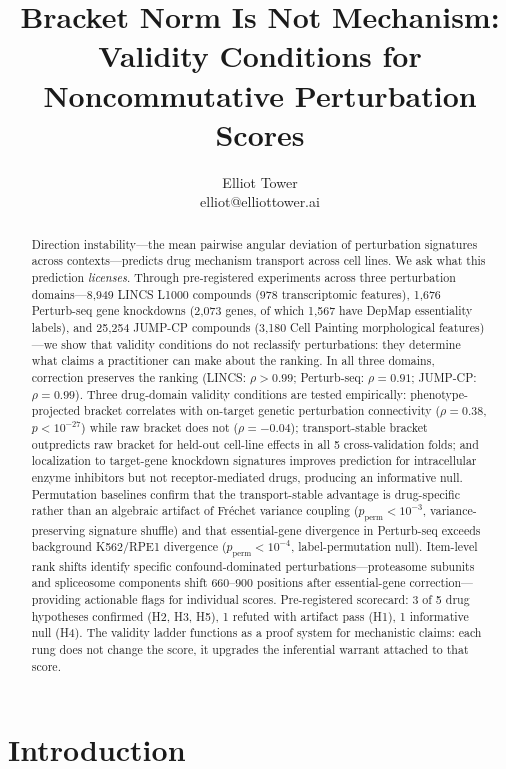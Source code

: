 \documentclass{article}
\title{Bracket Norm Is Not Mechanism:\\ Validity Conditions for Noncommutative Perturbation Scores}
\author{\name Elliot Tower \\
      \email elliot@elliottower.ai}
\begin{document}
\maketitle

\begin{abstract}
Direction instability---the mean pairwise angular deviation of perturbation
signatures across contexts---predicts drug mechanism transport across cell
lines. We ask what this prediction \emph{licenses}. Through pre-registered
experiments across three perturbation domains---8{,}949 LINCS L1000
compounds (978 transcriptomic features), 1{,}676 Perturb-seq gene
knockdowns \citep{replogle2022mapping} (2{,}073 genes, of which 1{,}567
have DepMap essentiality labels), and 25{,}254 JUMP-CP compounds (3{,}180
Cell Painting morphological features)---we show that validity conditions do
not reclassify perturbations: they determine what claims a practitioner can
make about the ranking. In all three domains, correction preserves the
ranking (LINCS: $\rho > 0.99$; Perturb-seq: $\rho = 0.91$; JUMP-CP:
$\rho = 0.99$). Three drug-domain validity conditions are tested
empirically: phenotype-projected bracket correlates with on-target genetic
perturbation connectivity ($\rho = 0.38$, $p < 10^{-27}$) while raw
bracket does not ($\rho = -0.04$); transport-stable bracket outpredicts raw
bracket for held-out cell-line effects in all 5 cross-validation folds; and
localization to target-gene knockdown signatures improves prediction for
intracellular enzyme inhibitors but not receptor-mediated drugs, producing
an informative null. Permutation baselines confirm that the transport-stable
advantage is drug-specific rather than an algebraic artifact of Fr\'echet
variance coupling ($p_{\text{perm}} < 10^{-3}$, variance-preserving
signature shuffle) and that essential-gene divergence in Perturb-seq exceeds
background K562/RPE1 divergence ($p_{\text{perm}} < 10^{-4}$,
label-permutation null). Item-level rank shifts identify specific
confound-dominated perturbations---proteasome subunits and spliceosome
components shift 660--900 positions after essential-gene correction---providing
actionable flags for individual scores. Pre-registered scorecard: 3 of 5
drug hypotheses confirmed (H2, H3, H5), 1 refuted with artifact pass (H1),
1 informative null (H4). The validity ladder functions as a proof system for
mechanistic claims: each rung does not change the score, it upgrades the
inferential warrant attached to that score.
\end{abstract}

\section{Introduction}
\end{document}
